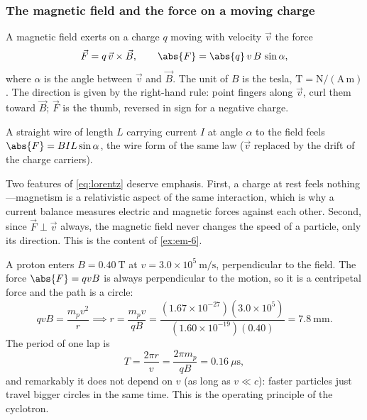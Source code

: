 \subsubsection{The magnetic field and the force on a moving charge}

\begin{definition}\label{def:magnetic-field}
A magnetic field exerts on a charge $q$ moving with velocity $\vec{v}$ the force
\begin{equation}\label{eq:lorentz}
  \vec{F} = q\,\vec{v}\times\vec{B}, \qquad \abs{F} = \abs{q}\,v\,B\,\sin\alpha,
\end{equation}
where $\alpha$ is the angle between $\vec{v}$ and $\vec{B}$. The unit of $B$ is the tesla, $\mathrm{T} = \mathrm{N/(A\,m)}$. The direction is given by the right-hand rule: point fingers along $\vec{v}$, curl them toward $\vec{B}$; $\vec{F}$ is the thumb, reversed in sign for a negative charge.

A straight wire of length $L$ carrying current $I$ at angle $\alpha$ to the field feels $\abs{F} = BIL\sin\alpha$, the wire form of the same law ($\vec{v}$ replaced by the drift of the charge carriers).
\end{definition}

Two features of \cref{eq:lorentz} deserve emphasis. First, a charge at rest feels nothing---magnetism is a relativistic aspect of the same interaction, which is why a current balance measures electric and magnetic forces against each other. Second, since $\vec{F}\perp\vec{v}$ always, the magnetic field never changes the speed of a particle, only its direction. This is the content of \cref{ex:em-6}.

\begin{example}\label{exm:proton-circle}
A proton enters $B = 0.40\ \mathrm{T}$ at $v = 3.0\times 10^{5}\ \mathrm{m/s}$, perpendicular to the field. The force $\abs{F} = qvB$ is always perpendicular to the motion, so it is a centripetal force and the path is a circle:
\[
  qvB = \frac{m_p v^2}{r} \implies r = \frac{m_p v}{qB} = \frac{(1.67\times 10^{-27})(3.0\times 10^{5})}{(1.60\times 10^{-19})(0.40)} = 7.8\ \mathrm{mm}.
\]
The period of one lap is
\[
  T = \frac{2\pi r}{v} = \frac{2\pi m_p}{qB} = 0.16\ \mu\mathrm{s},
\]
and remarkably it does not depend on $v$ (as long as $v\ll c$): faster particles just travel bigger circles in the same time. This is the operating principle of the cyclotron.
\end{example}

